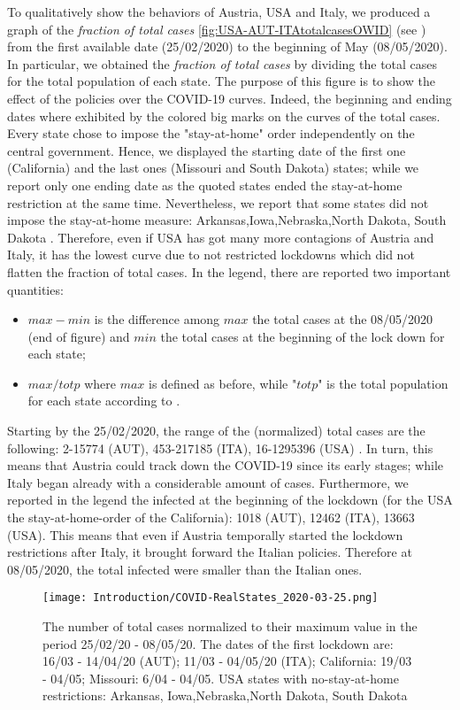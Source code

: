 \documentclass[a4paper,10pt,twoside]{book} %
\theoremstyle{definition}
\begin{document}
To qualitatively show the behaviors of Austria, USA and Italy, we produced a graph of the \textit{fraction of total cases}  \autoref{fig:USA-AUT-ITAtotalcasesOWID} (see \cite{JHUGitHub:2020_TotalCases}) from the first available date (25/02/2020) to the beginning of May (08/05/2020). In particular, we obtained the \textit{fraction of total cases} by dividing the total cases for the total population of each state.
The purpose of this figure is to show the effect of the policies over the COVID-19 curves.
Indeed, the beginning and ending dates where exhibited by the colored big marks on the curves of the total cases. Every state chose to impose the "stay-at-home" order independently on the central government. Hence, we displayed the starting date of the first one (California) and the last ones (Missouri and South Dakota) states; while we report only one ending date as the quoted states ended the stay-at-home restriction at the same time. Nevertheless, we report that some states did not impose the stay-at-home measure: Arkansas,Iowa,Nebraska,North Dakota,	South Dakota \cite{NBC_USA:2020_InitalDates}.
Therefore, even if USA has got many more contagions of Austria and Italy, it has the lowest curve due to not restricted lockdowns which did not flatten the fraction of total cases. 
In the legend, there are reported two important quantities:
\begin{itemize}
	\item $max - min$ is the difference among $max$ the total cases at the 08/05/2020 (end of figure) and $min$ the total cases at the beginning of the lock down for each state;
	\item $max / totp$ where $max$ is defined as before, while "$totp$" is the total population for each state according to \cite{PopulationEstimate}.
\end{itemize}
Starting by the 25/02/2020, the range of the (normalized) total cases are the following: 2-15774 (AUT), 453-217185 (ITA), 16-1295396 (USA) \cite{JHUGitHub:2020_TotalCases}. In turn, this means that Austria could track down the COVID-19 since its early stages; while Italy began already with a considerable amount of cases. Furthermore, we reported in the legend the infected at the beginning of the lockdown (for the USA the stay-at-home-order of the California): 1018 (AUT), 12462 (ITA), 13663 (USA). This means that even if Austria temporally started the lockdown restrictions after Italy, it brought forward the Italian policies. Therefore at 08/05/2020, the total infected were smaller than the Italian ones.
\begin{figure}[tbp]
	\centering
	\texttt{[image: Introduction/COVID-RealStates\_2020-03-25.png]}
	\caption{The number of total cases normalized to their maximum value in the period 25/02/20 - 08/05/20. The dates of the first lockdown are: 16/03 - 14/04/20 (AUT); 11/03 - 04/05/20 (ITA); California: 19/03 - 04/05; Missouri: 6/04 - 04/05. USA states with no-stay-at-home restrictions: Arkansas,	Iowa,Nebraska,North Dakota,	South Dakota}
	\label{fig:USA-AUT-ITAtotalcasesOWID}
\end{figure}
\end{document}
